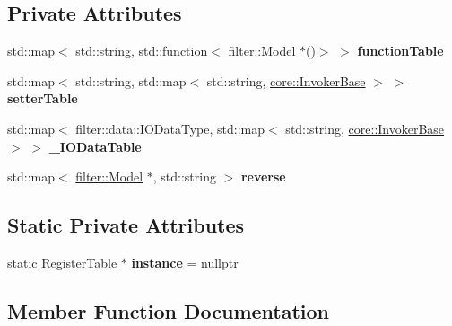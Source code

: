\subsection*{Private Attributes}
\begin{DoxyCompactItemize}
\item 
\mbox{\label{class_register_table_a286b7a53328beec72a173768a475d535}} 
std\+::map$<$ std\+::string, std\+::function$<$ \hyperlink{classfilter_1_1_model}{filter\+::\+Model} $\ast$()$>$ $>$ {\bfseries function\+Table}
\item 
\mbox{\label{class_register_table_a6ad21c97080c2bbc98825192fbbb83fb}} 
std\+::map$<$ std\+::string, std\+::map$<$ std\+::string, \hyperlink{classcore_1_1_invoker_base}{core\+::\+Invoker\+Base} $>$ $>$ {\bfseries setter\+Table}
\item 
\mbox{\label{class_register_table_a13c57b428f19bd593f132e43edf9c837}} 
std\+::map$<$ filter\+::data\+::\+I\+O\+Data\+Type, std\+::map$<$ std\+::string, \hyperlink{classcore_1_1_invoker_base}{core\+::\+Invoker\+Base} $>$ $>$ {\bfseries \+\_\+\+I\+O\+Data\+Table}
\item 
\mbox{\label{class_register_table_a1d0eb8144e2236145dbd42beaac30753}} 
std\+::map$<$ \hyperlink{classfilter_1_1_model}{filter\+::\+Model} $\ast$, std\+::string $>$ {\bfseries reverse}
\end{DoxyCompactItemize}
\subsection*{Static Private Attributes}
\begin{DoxyCompactItemize}
\item 
\mbox{\label{class_register_table_a325dfb954285f521722ab0df9591cb6c}} 
static \hyperlink{class_register_table}{Register\+Table} $\ast$ {\bfseries instance} = nullptr
\end{DoxyCompactItemize}


\subsection{Member Function Documentation}
\mbox{\label{class_register_table_aa5d0e1a193a71f430e11cd5596e3e2d4}} 
